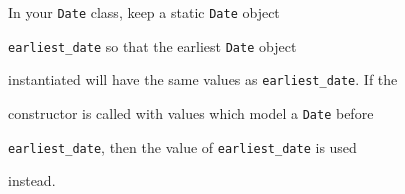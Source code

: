 In your \texttt{Date} class, keep a static \texttt{Date} object

\texttt{earliest\_date} so that the earliest \texttt{Date} object

instantiated will have the same values as \texttt{earliest\_date}. If the

constructor is called with values which model a \texttt{Date} before

\texttt{earliest\_date}, then the value of \texttt{earliest\_date} is used

instead.

